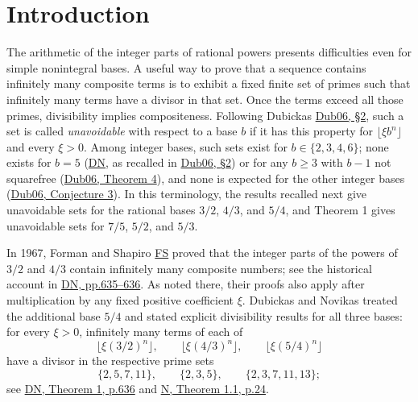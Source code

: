 \documentclass[11pt,reqno]{amsart}
\theoremstyle{definition}
\theoremstyle{remark}
\begin{document}
\section{Introduction}\label{sec:1}

The arithmetic of the integer parts of rational powers presents difficulties
even for simple nonintegral bases. A useful way to prove that a sequence
contains infinitely many composite terms is to exhibit a fixed finite set of
primes such that infinitely many terms have a divisor in that set. Once the
terms exceed all those primes, divisibility implies compositeness.
Following Dubickas \hyperref[ref-dub06]{Dub06, §2}, such a set is called
\emph{unavoidable} with respect to a base \(b\) if it has this property for
\(\lfloor\xi b^n\rfloor\) and every \(\xi>0\). Among integer bases, such
sets exist for \(b\in\{2,3,4,6\}\); none exists for \(b=5\)
(\hyperref[ref-dn]{DN}, as recalled in \hyperref[ref-dub06]{Dub06, §2}) or
for any \(b\ge3\) with \(b-1\) not squarefree
(\hyperref[ref-dub06]{Dub06, Theorem 4}), and none is expected for the
other integer bases (\hyperref[ref-dub06]{Dub06, Conjecture 3}). In this
terminology, the results recalled next give unavoidable sets for the
rational bases \(3/2\), \(4/3\), and \(5/4\), and Theorem 1 gives
unavoidable sets for \(7/5\), \(5/2\), and \(5/3\).

In 1967, Forman and Shapiro \hyperref[ref-fs]{FS} proved that the integer
parts of the powers of \(3/2\) and \(4/3\) contain infinitely many
composite numbers; see the historical account in
\hyperref[ref-dn]{DN, pp.635--636}. As noted there, their proofs also apply
after multiplication by any fixed positive coefficient \(\xi\).
Dubickas and Novikas treated the additional base \(5/4\) and stated
explicit divisibility results for all three bases: for every \(\xi>0\),
infinitely many terms of each of
\[
\lfloor\xi(3/2)^n\rfloor,\qquad
\lfloor\xi(4/3)^n\rfloor,\qquad
\lfloor\xi(5/4)^n\rfloor
\]
have a divisor in the respective prime sets
\[
\{2,5,7,11\},\qquad \{2,3,5\},\qquad \{2,3,7,11,13\};
\]
see \hyperref[ref-dn]{DN, Theorem 1, p.636} and
\hyperref[ref-n]{N, Theorem 1.1, p.24}.
\end{document}
